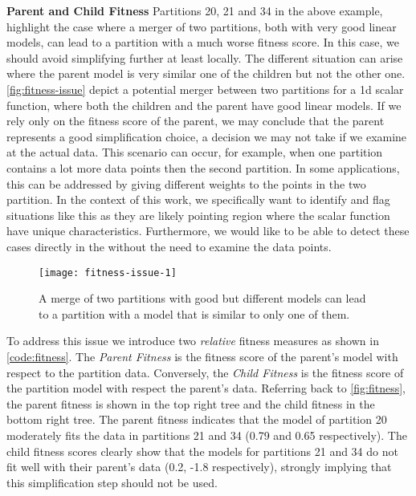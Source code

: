 \textbf{Parent and Child Fitness}
Partitions 20, 21 and 34 in the above example, highlight the case where a merger of two partitions, both with very good linear models, can lead to a partition with a much worse fitness score. In this case, we should avoid simplifying further at least locally. The different situation can arise where the parent model is very similar one of the children but not the other one. \autoref{fig:fitness-issue}
depict a potential merger between two partitions for a 1d scalar function, where both the children and the parent have good linear models. If we rely only on the fitness score of the parent, we may conclude that the parent represents a good simplification choice, a decision we may not take if we examine at the actual data. This scenario can occur, for example, when one partition contains a lot more data points then the second partition. In some applications, this can be addressed by giving different weights to the points in the two partition. In the context of this work, we specifically want to identify and flag situations like this as they are likely pointing region where the scalar function have unique characteristics. Furthermore, we would like to be able to detect these cases directly in the \RT without the need to examine the data points.
\begin{figure}[b]
    \begin{center}
     \texttt{[image: fitness-issue-1]}
    \caption{A merge of two partitions with good but different models can lead to a partition with a model that is similar to only one of them.}
    \label{fig:fitness-issue}
    \end{center}
\end{figure}

To address this issue we introduce two \textit{relative} fitness measures as shown in \autoref{code:fitness}. The \textit{Parent Fitness} is the fitness score of the parent's model with respect to the partition data. Conversely, the \textit{Child Fitness} is the fitness score of the partition model with respect the parent's data. Referring back to \autoref{fig:fitness}, the parent fitness is shown in the top right tree and the child fitness in the bottom right tree. The parent fitness indicates that the model of partition 20 moderately fits the data in partitions 21 and 34 (0.79 and 0.65 respectively). The child fitness scores clearly show that the models for partitions 21 and 34 do not fit well with their parent's data (0.2, -1.8 respectively), strongly implying that this simplification step should not be used.



